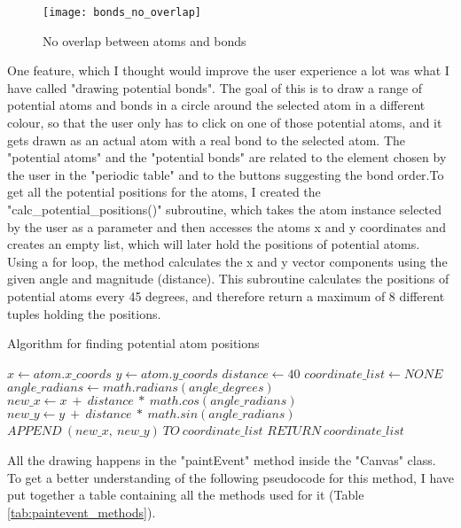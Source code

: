 \documentclass[a4paper,12pt]{article}
\begin{document}
\begin{figure} [h]
	\centering
	\texttt{[image: bonds\_no\_overlap]}
	\caption{No overlap between atoms and bonds}
	\label{fig:bonds_no_overlap}
\end{figure}

One feature, which I thought would improve the user experience a lot was what I have called "drawing potential bonds". The goal of this is to draw a range of potential atoms and bonds in a circle around the selected atom in a different colour, so that the user only has to click on one of those potential atoms, and it gets drawn as an actual atom with a real bond to the selected atom. The "potential atoms" and the "potential bonds" are related to the element chosen by the user in the "periodic table" and to the buttons suggesting the bond order.To get all the potential positions for the atoms, I created the "calc\_potential\_positions()" subroutine, which takes the atom instance selected by the user as a parameter and then accesses the atoms x and y coordinates and creates an empty list, which will later hold the positions of potential atoms. Using a for loop, the method calculates the x and y vector components using the given angle and magnitude (distance). This subroutine calculates the positions of potential atoms every 45 degrees, and therefore return a maximum of 8 different tuples holding the positions.

\begin{algorithm}
\footnotesize
\caption{Algorithm for finding potential atom positions}\label{alg:calc_potential_pos}
\begin{algorithmic}
\State $ x\gets atom.x\_coords$
\State $ y\gets atom.y\_coords$
\State $ distance\gets 40$
\State $ coordinate\_list\gets NONE$
	\State $ angle\_radians\gets math.radians(angle\_degrees)$
	\State $ new\_x\gets x\ +\ distance\ *\ math.cos(angle\_radians)$
	\State $ new\_y\gets y\ +\ distance\ *\ math.sin(angle\_radians)$
	\State $ APPEND\ (new\_x,\ new\_y)\ TO\ coordinate\_list$
\EndFor
\State $ RETURN\ coordinate\_list$
\EndFunction
\end{algorithmic}
\end{algorithm}

All the drawing happens in the "paintEvent" method inside the "Canvas" class. To get a better understanding of the following pseudocode for this method, I have put together a table containing all the methods used for it (Table \ref{tab:paintevent_methods}).
\end{document}
